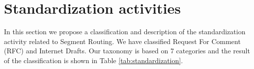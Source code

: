 \section{Standardization activities}
\label{sec:standard}
\begin{comment}

\begin{itemize}
    \item Describe all the standardization activities
    \item A first list can be found here http://www.segment-routing.net/ietf/ 
    \item Complete the section with the new drafts not listed above
\end{itemize}
\end{comment}
In this section we propose a classification and description of the standardization activity related to Segment Routing. We have classified  \numRFCStandardization Request For Comment (RFC) and \numDrafttandardization Internet Drafts. Our taxonomy is based on 7 categories and the result of the classification is shown in Table \ref{tab:standardization}. 


